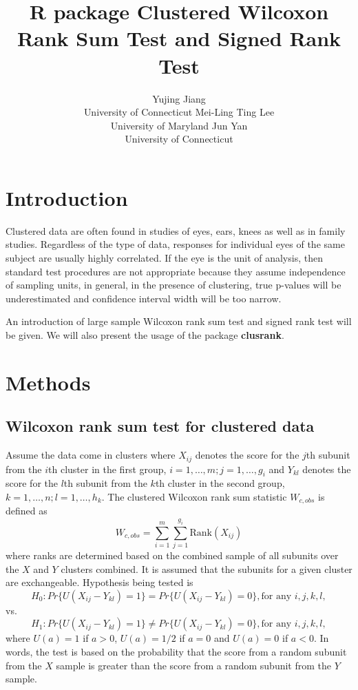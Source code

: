 \documentclass[article]{jss}
\author{Yujing Jiang\\ University of Connecticut \And 
        Mei-Ling Ting Lee\\ University of Maryland
        \And  
        Jun Yan\\ University of Connecticut }
\title{R package Clustered Wilcoxon Rank Sum Test and Signed Rank Test}
\begin{document}

\section{Introduction}
Clustered data are often found in studies of eyes, ears, knees as well as in family studies. Regardless of the type of data, responses for individual eyes of the same subject are usually highly correlated. If the eye is the unit of analysis, then standard test procedures are not appropriate because they assume independence of sampling units, in general, in the presence of clustering, true p-values will be underestimated and confidence interval width will be too narrow. 

An introduction of large sample Wilcoxon rank sum test and signed rank test will be given. We will also present the usage of the package \textbf{clusrank}.
\section{Methods}
\subsection{Wilcoxon rank sum test for clustered data}
Assume the data come in clusters where $X_{ij}$ denotes the score for the $j$th subunit from the $i$th cluster in the first group, $i = 1,\ldots,m; j = 1,\ldots,g_i$ and $Y_{kl}$ denotes the score for the $l$th subunit from the $k$th cluster in the second group, $k=1, \ldots,n;l=1,\ldots,h_k$. The clustered Wilcoxon rank sum statistic $W_{c,obs}$ is defined as 
\begin{equation}
W_{c,obs} = \sum_{i=1}^m\sum_{j=1}^{g_i}\text{Rank}(X_{ij})
\end{equation}
where ranks are determined based on the combined sample of all subunits over the $X$ and $Y$ clusters combined. It is assumed that the subunits for a given cluster are exchangeable. Hypothesis being tested is 
$$H_0: Pr\{U(X_{ij} - Y_{kl}) = 1\} = Pr\{U(X_{ij} - Y_{kl}) = 0\}, \text{for any }i, j, k, l,$$
vs.$$H_1:Pr\{U(X_{ij} - Y_{kl}) = 1\} \not = Pr\{U(X_{ij} - Y_{kl}) = 0\}, \text{for any }i, j, k, l,$$
where $U(a) = 1$ if $a > 0$, $U(a) = 1/2$ if $a = 0$ and $U(a) = 0$ if $a < 0$.
In words, the test is based on the probability that the score from a random subunit from the $X$ sample is greater than the score from a random subunit from the $Y$ sample. 
\end{document}
